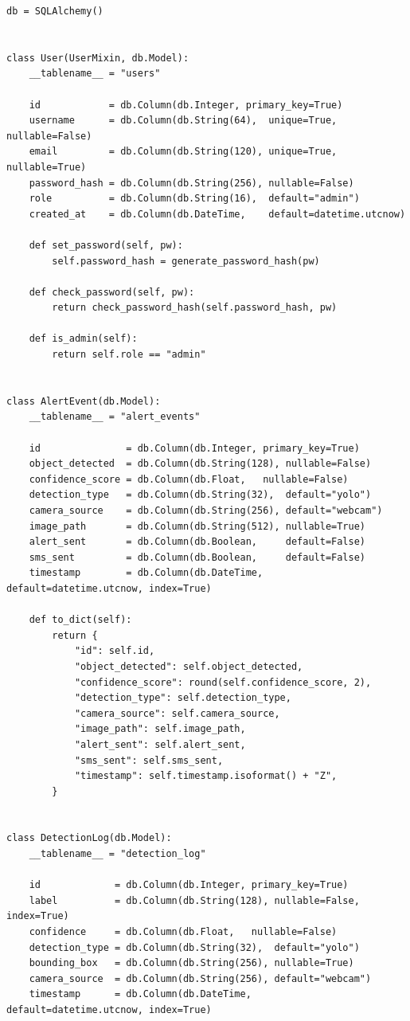 \documentclass[10pt,openany]{report}
\begin{document}
\begin{sloppypar}
{{{\begin{sloppypar}
\begin{lstlisting}
db = SQLAlchemy()


class User(UserMixin, db.Model):
    __tablename__ = "users"

    id            = db.Column(db.Integer, primary_key=True)
    username      = db.Column(db.String(64),  unique=True, nullable=False)
    email         = db.Column(db.String(120), unique=True, nullable=True)
    password_hash = db.Column(db.String(256), nullable=False)
    role          = db.Column(db.String(16),  default="admin")
    created_at    = db.Column(db.DateTime,    default=datetime.utcnow)

    def set_password(self, pw):
        self.password_hash = generate_password_hash(pw)

    def check_password(self, pw):
        return check_password_hash(self.password_hash, pw)

    def is_admin(self):
        return self.role == "admin"


class AlertEvent(db.Model):
    __tablename__ = "alert_events"

    id               = db.Column(db.Integer, primary_key=True)
    object_detected  = db.Column(db.String(128), nullable=False)
    confidence_score = db.Column(db.Float,   nullable=False)
    detection_type   = db.Column(db.String(32),  default="yolo")
    camera_source    = db.Column(db.String(256), default="webcam")
    image_path       = db.Column(db.String(512), nullable=True)
    alert_sent       = db.Column(db.Boolean,     default=False)
    sms_sent         = db.Column(db.Boolean,     default=False)
    timestamp        = db.Column(db.DateTime,    default=datetime.utcnow, index=True)

    def to_dict(self):
        return {
            "id": self.id,
            "object_detected": self.object_detected,
            "confidence_score": round(self.confidence_score, 2),
            "detection_type": self.detection_type,
            "camera_source": self.camera_source,
            "image_path": self.image_path,
            "alert_sent": self.alert_sent,
            "sms_sent": self.sms_sent,
            "timestamp": self.timestamp.isoformat() + "Z",
        }


class DetectionLog(db.Model):
    __tablename__ = "detection_log"

    id             = db.Column(db.Integer, primary_key=True)
    label          = db.Column(db.String(128), nullable=False, index=True)
    confidence     = db.Column(db.Float,   nullable=False)
    detection_type = db.Column(db.String(32),  default="yolo")
    bounding_box   = db.Column(db.String(256), nullable=True)
    camera_source  = db.Column(db.String(256), default="webcam")
    timestamp      = db.Column(db.DateTime,    default=datetime.utcnow, index=True)


\end{lstlisting}
\end{sloppypar}}}}
\end{sloppypar}
\end{document}
